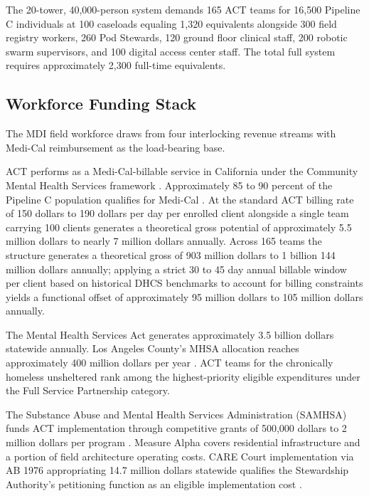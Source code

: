 \documentclass[12pt, letterpaper]{article}
\begin{document}
The 20-tower, 40,000-person system demands 165 ACT teams for 16,500 Pipeline C individuals at 100 caseloads equaling 1,320 equivalents alongside 300 field registry workers, 260 Pod Stewards, 120 ground floor clinical staff, 200 robotic swarm supervisors, and 100 digital access center staff. The total full system requires approximately 2,300 full-time equivalents.

\clearpage

\subsection{Workforce Funding Stack}

The MDI field workforce draws from four interlocking revenue streams with Medi-Cal reimbursement as the load-bearing base.

ACT performs as a Medi-Cal-billable service in California under the Community Mental Health Services framework \citep{medi_cal_act_2024}. Approximately 85 to 90 percent of the Pipeline C population qualifies for Medi-Cal \citep{ucsf_bhhi_2023}. At the standard ACT billing rate of 150 dollars to 190 dollars per day per enrolled client alongside a single team carrying 100 clients generates a theoretical gross potential of approximately 5.5 million dollars to nearly 7 million dollars annually. Across 165 teams the structure generates a theoretical gross of 903 million dollars to 1 billion 144 million dollars annually; applying a strict 30 to 45 day annual billable window per client based on historical DHCS benchmarks to account for billing constraints \citep{dhcs_act_utilization_2024} yields a functional offset of approximately 95 million dollars to 105 million dollars annually.

The Mental Health Services Act generates approximately 3.5 billion dollars statewide annually. Los Angeles County's MHSA allocation reaches approximately 400 million dollars per year \citep{mhsa_2024}. ACT teams for the chronically homeless unsheltered rank among the highest-priority eligible expenditures under the Full Service Partnership category.

The Substance Abuse and Mental Health Services Administration (SAMHSA) funds ACT implementation through competitive grants of 500,000 dollars to 2 million dollars per program \citep{samhsa_act_2024}. Measure Alpha covers residential infrastructure and a portion of field architecture operating costs. CARE Court implementation via AB 1976 appropriating 14.7 million dollars statewide qualifies the Stewardship Authority's petitioning function as an eligible implementation cost \citep{ab_1976_2024}.
\end{document}
